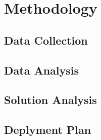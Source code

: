 
\section{Methodology}

\subsection{Data Collection}
	


\subsection{Data Analysis}






\subsection{Solution Analysis}
	



\subsection{Deplyment Plan}




